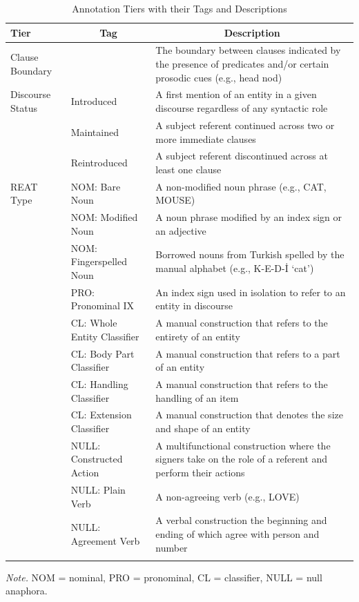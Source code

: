 \documentclass[]{elsarticle} %
\begin{document}
\begin{table}[p]

\begin{center}
\begin{threeparttable}

\caption{\label{tab:tab-2}Annotation Tiers with their Tags and Descriptions}

\footnotesize{

\begin{tabular}{p{3.2cm}p{3.8cm}p{3.8cm}}
\toprule
Tier & \multicolumn{1}{c}{Tag} & \multicolumn{1}{c}{Description}\\
\midrule
Clause Boundary &  & The boundary between clauses indicated by the presence of predicates and/or certain prosodic cues (e.g., head nod)\\
Discourse Status & Introduced & A first mention of an entity in a given discourse regardless of any syntactic role\\
 & Maintained & A subject referent continued across two or more immediate clauses\\
 & Reintroduced & A subject referent discontinued across at least one clause\\
REAT Type & NOM: Bare Noun & A non-modified noun phrase (e.g., CAT, MOUSE)\\
 & NOM: Modified Noun & A noun phrase modified by an index sign or an adjective\\
 & NOM: Fingerspelled Noun & Borrowed nouns from Turkish spelled by the manual alphabet (e.g., K-E-D-İ ‘cat’)\\
 & PRO: Pronominal IX & An index sign used in isolation to refer to an entity in discourse\\
 & CL: Whole Entity Classifier & A manual construction that refers to the entirety of an entity\\
 & CL: Body Part Classifier & A manual construction that refers to a part of an entity\\
 & CL: Handling Classifier & A manual construction that refers to the handling of an item\\
 & CL: Extension Classifier & A manual construction that denotes the size and shape of an entity\\
 & NULL: Constructed Action & A multifunctional construction where the signers take on the role of a referent and perform their actions\\
 & NULL: Plain Verb & A non-agreeing verb (e.g., LOVE)\\
 & NULL: Agreement Verb & A verbal construction the beginning and ending of which agree with person and number\\
\bottomrule
\addlinespace
\end{tabular}

}

\begin{tablenotes}[para]
\normalsize{\textit{Note.} NOM = nominal, PRO = pronominal, CL = classifier, NULL = null anaphora.}
\end{tablenotes}

\end{threeparttable}
\end{center}

\end{table}
\end{document}
